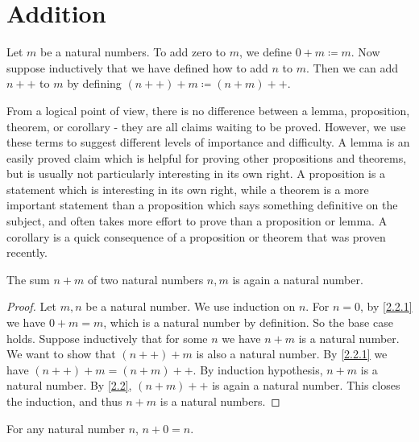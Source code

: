 \section{Addition}\label{sec:2.2}

\begin{defn}\label{2.2.1}
  Let \(m\) be a natural numbers.
  To add zero to \(m\), we define \(0+m \coloneqq m\).
  Now suppose inductively that we have defined how to add \(n\) to \(m\).
  Then we can add \(n++\) to \(m\) by defining \((n++) + m \coloneqq (n + m)++\).
\end{defn}

\begin{note}
  From a logical point of view, there is no difference between a lemma, proposition, theorem, or corollary
  - they are all claims waiting to be proved.
  However, we use these terms to suggest different levels of importance and difficulty.
  A lemma is an easily proved claim which is helpful for proving other propositions and theorems, but is usually not particularly interesting in its own right.
  A proposition is a statement which is interesting in its own right, while a theorem is a more important statement than a proposition which says something definitive on the subject, and often takes more effort to prove than a proposition or lemma.
  A corollary is a quick consequence of a proposition or theorem that was proven recently.
\end{note}

\begin{ac}\label{ac:2.2.1}
  The sum \(n + m\) of two natural numbers \(n, m\) is again a natural number.
\end{ac}

\begin{proof}
  Let \(m, n\) be a natural number.
  We use induction on \(n\).
  For \(n = 0\), by \cref{2.2.1} we have \(0 + m = m\), which is a natural number by definition.
  So the base case holds.
  Suppose inductively that for some \(n\) we have \(n + m\) is a natural number.
  We want to show that \((n++) + m\) is also a natural number.
  By \cref{2.2.1} we have \((n++) + m = (n + m)++\).
  By induction hypothesis, \(n + m\) is a natural number.
  By \cref{2.2}, \((n + m)++\) is again a natural number.
  This closes the induction, and thus \(n + m\) is a natural numbers.
\end{proof}

\begin{lem}\label{2.2.2}
  For any natural number \(n\), \(n + 0 = n\).
\end{lem}

